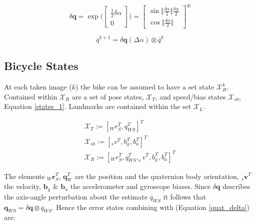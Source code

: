 \documentclass[a4paper,11pt,notitlepage]{article}
\begin{document}
\begin{equation}
\label{quat_delta}
\delta \textbf{q} = \exp{ \bigg(
    \begin{bmatrix}
        \frac{1}{2}\delta \alpha \\[0.3em]
       0
     \end{bmatrix} \bigg) }= \begin{bmatrix}
        \sin \Vert \frac{\delta \alpha}{2} \Vert \frac{\delta \alpha}{2} \\[0.3em]
       \cos \Vert \frac{\delta \alpha}{2} \Vert
     \end{bmatrix} ^{\oplus}
\end{equation}

\begin{equation}
\label{quat_opt}
\overline{q}^{k+1} = \delta \textbf{q}(\Delta \alpha) \otimes \overline{q}^{k}
\end{equation}

\subsection{Bicycle States}

At each taken image ($k$) the bike can be assumed to have a set state $\mathcal{X}_{R}^{k}$. Contained within $\mathcal{X}_{R}$ are a set of pose states, $\mathcal{X}_{T}$, and speed/bias states $\mathcal{X}_{sb}$, Equation \ref{states_1}. Landmarks are contained within the set $\mathcal{X}_{L}$.

\begin{equation}
\begin{aligned}
\label{states_1}
\mathcal{X}_{T} := [ _{W}r_{S}^{T},q_{WS}^{T} ]^{T} \\
\mathcal{X}_{sb} := [ _{s}v^{T},b_{g}^{T}, b_{a}^{T} ]^{T} \\
\mathcal{X}_{R} := [ _{W}r_{S}^{T},q_{WS}^{T},_{s}v^{T},b_{g}^{T}, b_{a}^{T}]^{T}
\end{aligned}
\end{equation}

The elements $_{W}\textbf{r}_{S}^{T}$, $\textbf{{q}}_{W}^{T}$ are the position and the quaternion body orientation, $_{s}\textbf{{v}}^{T}$ the velocity, $\textbf{{b}}_{g}$ \& $\textbf{{b}}_{a}$ the accelerometer and gyroscope biases. Since $\delta \textbf{q}$ describes the axis-angle perturbation about the estimate $\overline{q}_{WS}$ it follows that $\textbf{q}_{WS} = \delta \textbf{q} \otimes \overline{q}_{WS}$. Hence the error states combining with (Equation \ref{quat_delta}) are:
\end{document}
